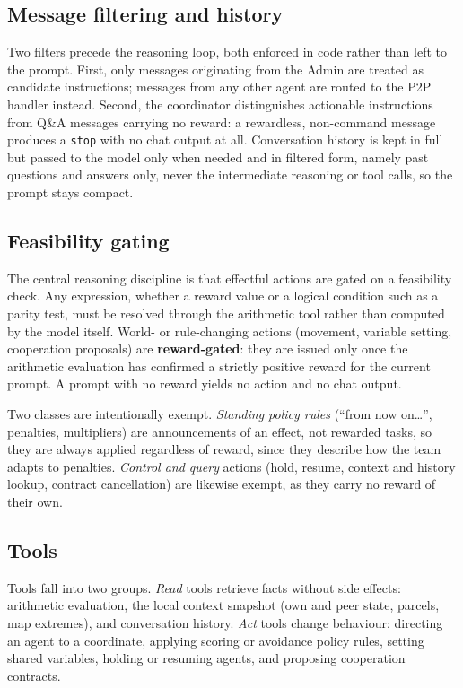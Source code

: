 \documentclass[a4paper,11pt]{article}
\begin{document}
\subsection{Message filtering and history}

Two filters precede the reasoning loop, both enforced in code rather than left to the
prompt. First, only messages originating from the Admin are treated as candidate
instructions; messages from any other agent are routed to the P2P handler instead.
Second, the coordinator distinguishes actionable instructions from Q\&A messages
carrying no reward: a rewardless, non-command message produces a \texttt{stop} with
no chat output at all. Conversation history is kept in full but passed to the model
only when needed and in filtered form, namely past questions and answers only, never
the intermediate reasoning or tool calls, so the prompt stays compact.

\subsection{Feasibility gating}

The central reasoning discipline is that effectful actions are gated on a feasibility
check. Any expression, whether a reward value or a logical condition such as a parity
test, must be resolved through the arithmetic tool rather than computed by the model
itself. World- or rule-changing actions (movement, variable setting, cooperation
proposals) are \textbf{reward-gated}: they are issued only once the arithmetic
evaluation has confirmed a strictly positive reward for the current prompt. A prompt
with no reward yields no action and no chat output.

Two classes are intentionally exempt. \emph{Standing policy rules}
(``from now on\ldots'', penalties, multipliers) are announcements of an effect, not
rewarded tasks, so they are always applied regardless of reward, since they describe
how the team adapts to penalties. \emph{Control and query} actions (hold, resume,
context and history lookup, contract cancellation) are likewise exempt, as they carry
no reward of their own.

\subsection{Tools}

Tools fall into two groups. \emph{Read} tools retrieve facts without side effects:
arithmetic evaluation, the local context snapshot (own and peer state, parcels, map
extremes), and conversation history. \emph{Act} tools change behaviour: directing an
agent to a coordinate, applying scoring or avoidance policy rules, setting shared
variables, holding or resuming agents, and proposing cooperation contracts.
\end{document}
